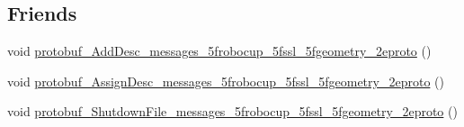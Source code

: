 \subsection*{Friends}
\begin{DoxyCompactItemize}
\item 
void \hyperlink{class_s_s_l___geometry_field_size_a7d99889adee2c69f6bdd945449284431}{protobuf\-\_\-\-Add\-Desc\-\_\-messages\-\_\-5frobocup\-\_\-5fssl\-\_\-5fgeometry\-\_\-2eproto} ()
\item 
void \hyperlink{class_s_s_l___geometry_field_size_a1fc037efb8fe2bb0942e88857a9baf62}{protobuf\-\_\-\-Assign\-Desc\-\_\-messages\-\_\-5frobocup\-\_\-5fssl\-\_\-5fgeometry\-\_\-2eproto} ()
\item 
void \hyperlink{class_s_s_l___geometry_field_size_ac3ccd1382cfb3dfd4eb3eb85981705c6}{protobuf\-\_\-\-Shutdown\-File\-\_\-messages\-\_\-5frobocup\-\_\-5fssl\-\_\-5fgeometry\-\_\-2eproto} ()
\end{DoxyCompactItemize}


